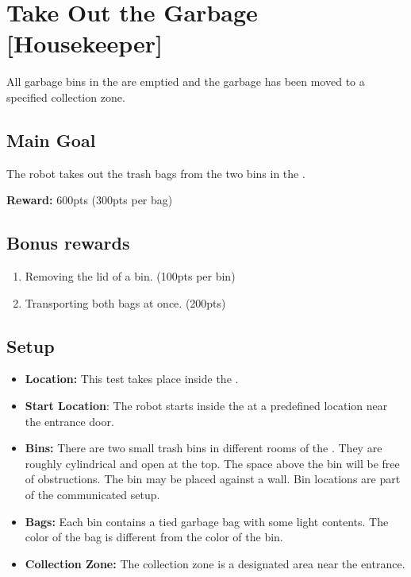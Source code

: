\section{Take Out the Garbage [Housekeeper]}
\label{test:take-out-the-garbage}
All garbage bins in the \Arena{} are emptied and the garbage has been moved to a specified collection zone.


\subsection*{Main Goal}
The robot takes out the trash bags from the two bins in the \Arena{}.

\noindent\textbf{Reward:} 600pts (300pts per bag)

\subsection*{Bonus rewards}
\begin{enumerate}[nosep]
	\item Removing the lid of a bin. (100pts per bin)
	\item Transporting both bags at once. (200pts)
\end{enumerate}

\subsection*{Setup}
\begin{itemize}[nosep]
	\item \textbf{Location:} This test takes place inside the \Arena{}.
	\item \textbf{Start Location}: The robot starts inside the \Arena{} at a predefined location near the entrance door.
	\item \textbf{Bins:} There are two small trash bins in different rooms of the \Arena{}. They are roughly cylindrical and open at the top. The space above the bin will be free of obstructions. The bin may be placed against a wall. Bin locations are part of the communicated \Arena{} setup.
	\item \textbf{Bags:} Each bin contains a tied garbage bag with some light contents. The color of the bag is different from the color of the bin.
	\item \textbf{Collection Zone:} The collection zone is a designated area near the entrance.
\end{itemize}


